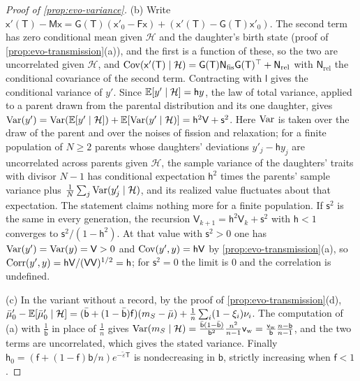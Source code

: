 \begin{proof}[Proof of \cref{prop:evo-variance}]
(b) Write $\mathsf x'(\mathsf T)-\mathsf M\mathsf x=\mathsf G(\mathsf T)(\mathsf x'_0-\mathsf F\mathsf x)+(\mathsf x'(\mathsf T)-\mathsf G(\mathsf T)\mathsf x'_0)$. The second term has zero conditional mean given $\mathcal H$ and the daughter's birth state (proof of \cref{prop:evo-transmission}(a)), and the first is a function of these, so the two are uncorrelated given $\mathcal H$, and $\operatorname{Cov}(\mathsf x'(\mathsf T)\mid\mathcal H)=\mathsf G(\mathsf T)\mathsf N_{\mathrm{fis}}\mathsf G(\mathsf T)^\top+\mathsf N_{\mathrm{rel}}$ with $\mathsf N_{\mathrm{rel}}$ the conditional covariance of the second term. Contracting with $\mathsf l$ gives the conditional variance of $y'$. Since $\mathbb{E}[y'\mid\mathcal H]=\mathsf hy$, the law of total variance, applied to a parent drawn from the parental distribution and its one daughter, gives $\operatorname{Var}(y')=\operatorname{Var}(\mathbb{E}[y'\mid\mathcal H])+\mathbb{E}[\operatorname{Var}(y'\mid\mathcal H)]=\mathsf h^2\mathsf V+\mathsf s^2$. Here $\operatorname{Var}$ is taken over the draw of the parent and over the noises of fission and relaxation; for a finite population of $N\ge2$ parents whose daughters' deviations $y'_j-\mathsf hy_j$ are uncorrelated across parents given $\mathcal H$, the sample variance of the daughters' traits with divisor $N-1$ has conditional expectation $\mathsf h^2$ times the parents' sample variance plus $\frac1N\sum_j\operatorname{Var}(y'_j\mid\mathcal H)$, and its realized value fluctuates about that expectation. The statement claims nothing more for a finite population. If $\mathsf s^2$ is the same in every generation, the recursion $\mathsf V_{k+1}=\mathsf h^2\mathsf V_k+\mathsf s^2$ with $\mathsf h<1$ converges to $\mathsf s^2/(1-\mathsf h^2)$. At that value with $\mathsf s^2>0$ one has $\operatorname{Var}(y')=\operatorname{Var}(y)=\mathsf V>0$ and $\operatorname{Cov}(y',y)=\mathsf h\mathsf V$ by \cref{prop:evo-transmission}(a), so $\operatorname{Corr}(y',y)=\mathsf h\mathsf V/(\mathsf V\mathsf V)^{1/2}=\mathsf h$; for $\mathsf s^2=0$ the limit is $0$ and the correlation is undefined.

(c) In the variant without a record, by the proof of \cref{prop:evo-transmission}(d), $\bar\mu'_0-\mathbb{E}[\bar\mu'_0\mid\mathcal H]=(\bar{\mathsf b}+(1-\bar{\mathsf b})\mathsf f)(m_S-\bar\mu)+\frac1n\sum_i(1-\xi_i)\nu_i$. The computation of (a) with $\frac1{\mathsf b}$ in place of $\frac1n$ gives $\operatorname{Var}(m_S\mid\mathcal H)=\frac{\bar{\mathsf b}(1-\bar{\mathsf b})}{\mathsf b^2}\frac{n^2}{n-1}\mathsf v_{\mathrm w}=\frac{\mathsf v_{\mathrm w}}{\mathsf b}\frac{n-\mathsf b}{n-1}$, and the two terms are uncorrelated, which gives the stated variance. Finally $\mathsf h_0=(\mathsf f+(1-\mathsf f)\mathsf b/n)e^{-\tilde\varepsilon\mathsf T}$ is nondecreasing in $\mathsf b$, strictly increasing when $\mathsf f<1$.
\end{proof}

